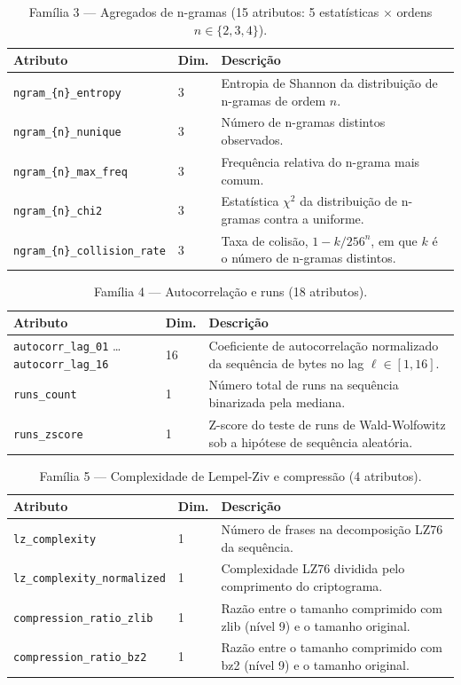 \begin{table}[htb]
\centering
\caption{Família 3 --- Agregados de n-gramas (15 atributos: 5 estatísticas $\times$ ordens $n \in \{2, 3, 4\}$).}
\begin{tabular}{llp{7.5cm}}
\toprule
Atributo & Dim. & Descrição \\
\midrule
\texttt{ngram\_\{n\}\_entropy}        & 3 & Entropia de Shannon da distribuição de n-gramas de ordem $n$. \\
\texttt{ngram\_\{n\}\_nunique}        & 3 & Número de n-gramas distintos observados. \\
\texttt{ngram\_\{n\}\_max\_freq}      & 3 & Frequência relativa do n-grama mais comum. \\
\texttt{ngram\_\{n\}\_chi2}           & 3 & Estatística $\chi^2$ da distribuição de n-gramas contra a uniforme. \\
\texttt{ngram\_\{n\}\_collision\_rate} & 3 & Taxa de colisão, $1 - k/256^n$, em que $k$ é o número de n-gramas distintos. \\
\bottomrule
\end{tabular}
\end{table}

\begin{table}[htb]
\centering
\caption{Família 4 --- Autocorrelação e runs (18 atributos).}
\begin{tabular}{llp{7.5cm}}
\toprule
Atributo & Dim. & Descrição \\
\midrule
\texttt{autocorr\_lag\_01} \ldots \texttt{autocorr\_lag\_16} & 16 & Coeficiente de autocorrelação normalizado da sequência de bytes no lag $\ell \in [1, 16]$. \\
\texttt{runs\_count}  & 1 & Número total de runs na sequência binarizada pela mediana. \\
\texttt{runs\_zscore} & 1 & Z-score do teste de runs de Wald-Wolfowitz sob a hipótese de sequência aleatória. \\
\bottomrule
\end{tabular}
\end{table}

\begin{table}[htb]
\centering
\caption{Família 5 --- Complexidade de Lempel-Ziv e compressão (4 atributos).}
\begin{tabular}{llp{7.5cm}}
\toprule
Atributo & Dim. & Descrição \\
\midrule
\texttt{lz\_complexity}            & 1 & Número de frases na decomposição LZ76 da sequência. \\
\texttt{lz\_complexity\_normalized} & 1 & Complexidade LZ76 dividida pelo comprimento do criptograma. \\
\texttt{compression\_ratio\_zlib}   & 1 & Razão entre o tamanho comprimido com zlib (nível 9) e o tamanho original. \\
\texttt{compression\_ratio\_bz2}    & 1 & Razão entre o tamanho comprimido com bz2 (nível 9) e o tamanho original. \\
\bottomrule
\end{tabular}
\end{table}

